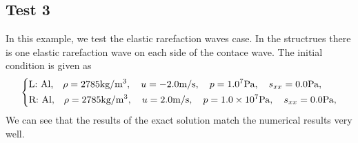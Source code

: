 \documentclass{article}
\numberwithin{equation}{section}
\numberwithin{table}{section}
\begin{document}
\subsection{Test 3}
In this example, we test the elastic rarefaction waves case. In the structrues there is one elastic rarefaction wave on each side of the contace wave. The initial condition is given as
\begin{equation}
 \left\{ \begin{aligned}
	 &	 \text{L: Al,}\quad  \rho = 2785 \text{kg}/\text{m}^3, \quad  u = -2.0\text{m}/\text{s}, \quad  p = 1.0\time 10^7\text{Pa}, \quad  s_{xx}=0.0 \text{Pa},\\
	 &	 \text{R: Al,}\quad  \rho = 2785 \text{kg}/\text{m}^3, \quad  u = 2.0\text{m}/\text{s}, \quad  p = 1.0\times 10^7 \text{Pa}, \quad  s_{xx}=0.0 \text{Pa},\\
   \end{aligned}
 \right.
\end{equation}
We can see that the results of the exact solution match the numerical results very well.
%
\end{document}
